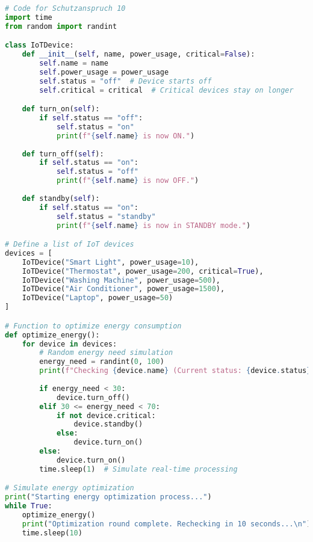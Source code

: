 {}
\begin{lstlisting}[language=python,caption=Code für Schutzanspruch 10, label=lst:schutz10]
# Code for Schutzanspruch 10
import time
from random import randint

class IoTDevice:
    def __init__(self, name, power_usage, critical=False):
        self.name = name
        self.power_usage = power_usage
        self.status = "off"  # Device starts off
        self.critical = critical  # Critical devices stay on longer

    def turn_on(self):
        if self.status == "off":
            self.status = "on"
            print(f"{self.name} is now ON.")
    
    def turn_off(self):
        if self.status == "on":
            self.status = "off"
            print(f"{self.name} is now OFF.")
    
    def standby(self):
        if self.status == "on":
            self.status = "standby"
            print(f"{self.name} is now in STANDBY mode.")

# Define a list of IoT devices
devices = [
    IoTDevice("Smart Light", power_usage=10),
    IoTDevice("Thermostat", power_usage=200, critical=True),
    IoTDevice("Washing Machine", power_usage=500),
    IoTDevice("Air Conditioner", power_usage=1500),
    IoTDevice("Laptop", power_usage=50)
]

# Function to optimize energy consumption
def optimize_energy():
    for device in devices:
        # Random energy need simulation
        energy_need = randint(0, 100)
        print(f"Checking {device.name} (Current status: {device.status}, Energy need: {energy_need})")
        
        if energy_need < 30:
            device.turn_off()
        elif 30 <= energy_need < 70:
            if not device.critical:
                device.standby()
            else:
                device.turn_on()
        else:
            device.turn_on()
        time.sleep(1)  # Simulate real-time processing

# Simulate energy optimization
print("Starting energy optimization process...")
while True:
    optimize_energy()
    print("Optimization round complete. Rechecking in 10 seconds...\n")
    time.sleep(10)
\end{lstlisting}